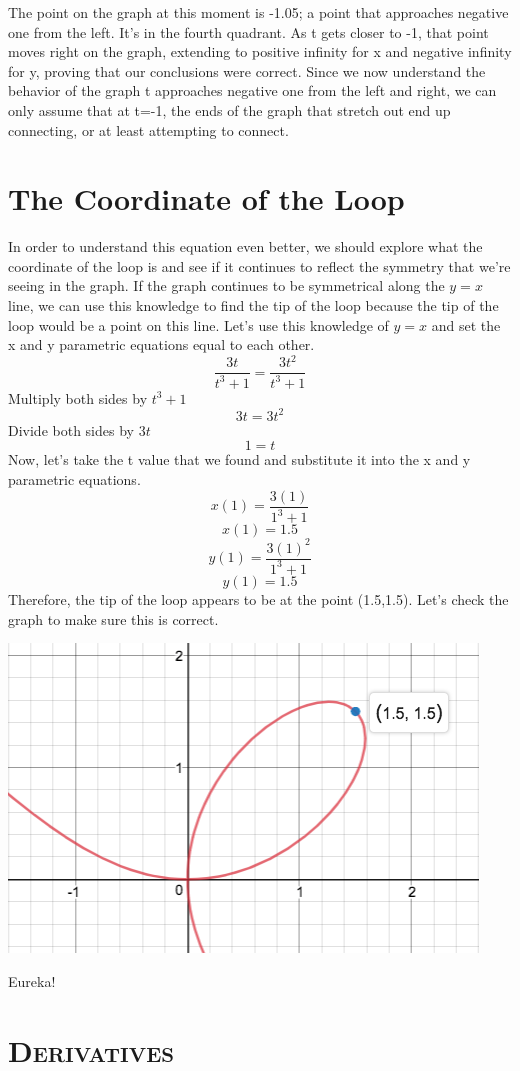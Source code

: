 \documentclass[a4paper,openright, 10pt]{article}
\newcommand{\ssection}[1]{%
\section[#1]{\centering\normalfont\scshape #1}}
\begin{document}
The point on the graph at this moment is -1.05; a point that approaches negative one from the left. It's in the fourth quadrant. As t gets closer to -1, that point moves right on the graph, extending to positive infinity for x and negative infinity for y, proving that our conclusions were correct. Since we now understand the behavior of the graph t approaches negative one from the left and right, we can only assume that at t=-1, the ends of the graph that stretch out end up connecting, or at least attempting to connect. 
\section*{The Coordinate of the Loop}
In order to understand this equation even better, we should explore what the coordinate of the loop is and see if it continues to reflect the symmetry that we're seeing in the graph. If the graph continues to be symmetrical along the $y=x$ line, we can use this knowledge to find the tip of the loop because the tip of the loop would be a point on this line. Let's use this knowledge of $y=x$ and set the x and y parametric equations equal to each other.
$$\frac{3t}{t^3+1}=\frac{3t^2}{t^3+1}$$
Multiply both sides by $t^3+1$
$$3t=3t^2$$
Divide both sides by $3t$
$$1=t$$
Now, let's take the t value that we found and substitute it into the x and y parametric equations.
$$x(1)=\frac{3(1)}{1^3+1}$$
$$x(1)=1.5$$
$$y(1)=\frac{3(1)^2}{1^3+1}$$
$$y(1)=1.5$$
Therefore, the tip of the loop appears to be at the point (1.5,1.5). Let's check the graph to make sure this is correct.
\begin{center}
    \includegraphics[scale=0.5]{graph6}
\end{center}
Eureka!
\ssection{Derivatives}
\end{document}
